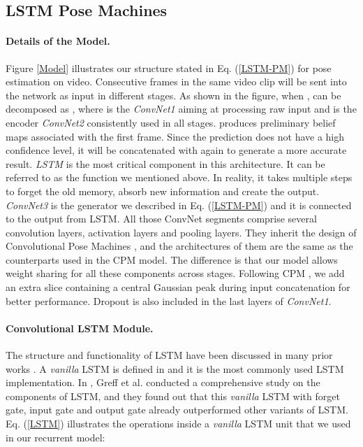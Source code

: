\documentclass[10pt,twocolumn,letterpaper]{article}
\begin{document}
\subsection{LSTM Pose Machines}

\paragraph{Details of the Model.}

Figure \ref{Model} illustrates our structure stated in Eq. (\ref{LSTM-PM}) for pose estimation on video. Consecutive frames in the same video clip will be sent into the network as input in different stages. As shown in the figure, when ,  can be decomposed as , where  is the \textit{ConvNet1} aiming at processing raw input and  is the encoder \textit{ConvNet2} consistently used in all stages.  produces preliminary belief maps associated with the first frame. Since the prediction does not have a high confidence level, it will be concatenated with  again to generate a more accurate result. \textit{LSTM} is the most critical component in this architecture. It can be referred to as the  function we mentioned above. In reality, it takes multiple steps to forget the old memory, absorb new information and create the output. \textit{ConvNet3} is the generator  we described in Eq. (\ref{LSTM-PM}) and it is connected to the output from LSTM. All those ConvNet segments comprise several convolution layers, activation layers and pooling layers. They inherit the design of Convolutional Pose Machines \cite{wei16refineCPM}, and the architectures of them are the same as the counterparts used in the CPM model. The difference is that our model allows weight sharing for all these components across stages. Following CPM \cite{wei16refineCPM}, we add an extra slice containing a central Gaussian peak during input concatenation for better performance. Dropout is also included in the last layers of \textit{ConvNet1}.

\paragraph{Convolutional LSTM Module.}
The structure and functionality of LSTM have been discussed in many prior works \cite{hoch97LSTM,greff15lstmod,shi15convLSTM}. A \textit{vanilla} LSTM is defined in \cite{greff15lstmod} and it is the most commonly used LSTM implementation. In \cite{greff15lstmod}, Greff et al. conducted a comprehensive study on the components of LSTM, and they found out that this \textit{vanilla} LSTM with forget gate, input gate and output gate already outperformed other variants of LSTM. Eq. (\ref{LSTM}) illustrates the operations inside a \textit{vanilla} LSTM unit that we used in our recurrent model:
\end{document}
